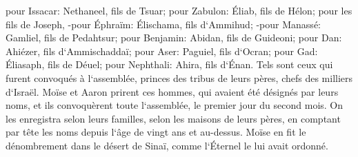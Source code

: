 \verse pour Issacar: Nethaneel, fils de Tsuar; 
\verse pour Zabulon: Éliab, fils de Hélon; 
\verse pour les fils de Joseph, -pour Éphraïm: Élischama, fils d`Ammihud; -pour Manassé: Gamliel, fils de Pedahtsur; 
\verse pour Benjamin: Abidan, fils de Guideoni; 
\verse pour Dan: Ahiézer, fils d`Ammischaddaï; 
\verse pour Aser: Paguiel, fils d`Ocran; 
\verse pour Gad: Éliasaph, fils de Déuel; 
\verse pour Nephthali: Ahira, fils d`Énan. 
\verse Tels sont ceux qui furent convoqués à l`assemblée, princes des tribus de leurs pères, chefs des milliers d`Israël. 
\verse Moïse et Aaron prirent ces hommes, qui avaient été désignés par leurs noms, 
\verse et ils convoquèrent toute l`assemblée, le premier jour du second mois. On les enregistra selon leurs familles, selon les maisons de leurs pères, en comptant par tête les noms depuis l`âge de vingt ans et au-dessus. 
\verse Moïse en fit le dénombrement dans le désert de Sinaï, comme l`Éternel le lui avait ordonné. 
